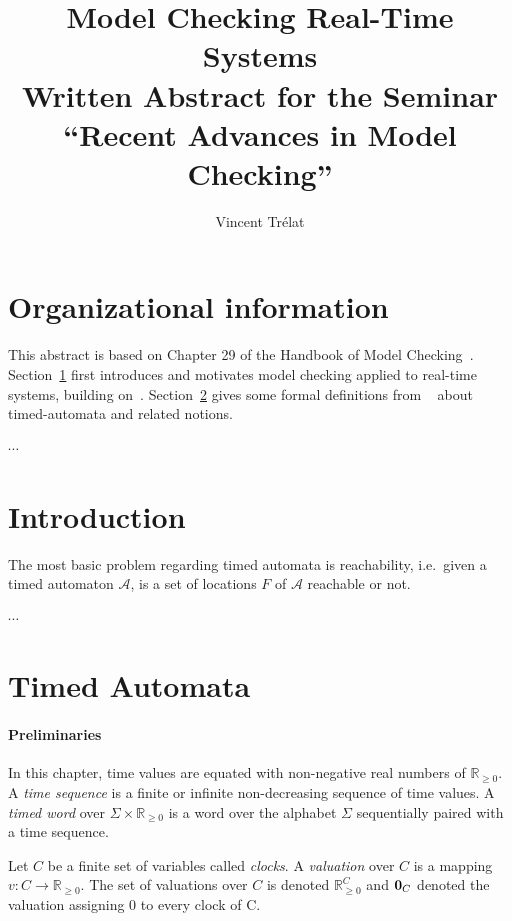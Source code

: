 \documentclass[11pt]{article}
\title{Model Checking Real-Time Systems\\\small Written Abstract for the Seminar ``Recent Advances in Model Checking''}
\author{Vincent Trélat}
\date{}
\theoremstyle{definition}
\theoremstyle{remark}
\theoremstyle{definition}
\begin{document}
\maketitle	

\section*{Organizational information}
This abstract is based on Chapter 29 of the Handbook of Model Checking~\cite{handbook}.
Section~\ref{sec:intro} first introduces and motivates model checking applied to real-time systems, building on~\cite[Chapters~29.1 and 29.2]{handbook}.
Section~\ref{sec:ta} gives some formal definitions from ~\cite[Chapter~29.2]{handbook} about timed-automata and related notions.

$\cdots$

\section{Introduction}\label{sec:intro}
The most basic problem regarding timed automata is reachability, i.e.\ given a timed automaton $\mathcal{A}$, is a set of locations $F$ of $\mathcal{A}$ reachable or not.

$\cdots$

\section{Timed Automata}\label{sec:ta}
\paragraph{Preliminaries}\label{par:prelims}
In this chapter, time values are equated with non-negative real numbers of $\mathbb{R}_{\geq 0}$. A \emph{time sequence} is a finite or infinite non-decreasing sequence of time values.
A \emph{timed word} over $\Sigma \times \mathbb{R}_{\geq 0}$ is a word over the alphabet $\Sigma$ sequentially paired with a time sequence.

Let $C$ be a finite set of variables called \emph{clocks}. A \emph{valuation} over $C$ is a mapping $v \colon C \to \mathbb{R}_{\geq 0}$. The set of valuations over $C$ is denoted $\mathbb{R}_{\geq 0}^C$ and $\text{\bf 0}_C$ denoted the valuation assigning 0 to every clock of C.
\end{document}
